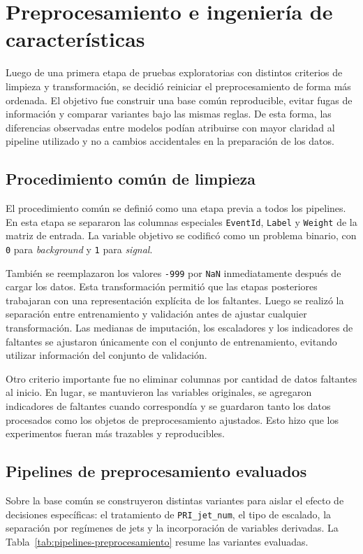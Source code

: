 \documentclass{article}
\begin{document}
\section{Preprocesamiento e ingeniería de características}
Luego de una primera etapa de pruebas exploratorias con distintos criterios de limpieza y transformación, se decidió reiniciar el preprocesamiento de forma más ordenada. El objetivo fue construir una base común reproducible, evitar fugas de información y comparar variantes bajo las mismas reglas. De esta forma, las diferencias observadas entre modelos podían atribuirse con mayor claridad al pipeline utilizado y no a cambios accidentales en la preparación de los datos.

\subsection{Procedimiento común de limpieza}
El procedimiento común se definió como una etapa previa a todos los pipelines. En esta etapa se separaron las columnas especiales \texttt{EventId}, \texttt{Label} y \texttt{Weight} de la matriz de entrada. La variable objetivo se codificó como un problema binario, con \texttt{0} para \textit{background} y \texttt{1} para \textit{signal}.

También se reemplazaron los valores \texttt{-999} por \texttt{NaN} inmediatamente después de cargar los datos. Esta transformación permitió que las etapas posteriores trabajaran con una representación explícita de los faltantes. Luego se realizó la separación entre entrenamiento y validación antes de ajustar cualquier transformación. Las medianas de imputación, los escaladores y los indicadores de faltantes se ajustaron únicamente con el conjunto de entrenamiento, evitando utilizar información del conjunto de validación.

Otro criterio importante fue no eliminar columnas por cantidad de datos faltantes al inicio. En lugar, se mantuvieron las variables originales, se agregaron indicadores de faltantes cuando correspondía y se guardaron tanto los datos procesados como los objetos de preprocesamiento ajustados. Esto hizo que los experimentos fueran más trazables y reproducibles.

\subsection{Pipelines de preprocesamiento evaluados}
Sobre la base común se construyeron distintas variantes para aislar el efecto de decisiones específicas: el tratamiento de \texttt{PRI\_jet\_num}, el tipo de escalado, la separación por regímenes de jets y la incorporación de variables derivadas. La Tabla~\ref{tab:pipelines-preprocesamiento} resume las variantes evaluadas.
\end{document}
